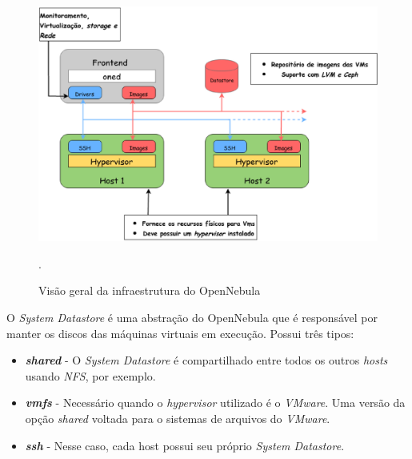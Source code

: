 \begin{figure}[!htb]
\centering
\includegraphics [keepaspectratio=true,scale=0.5]{figuras/opennebula_struct.eps}
\caption{Visão geral da infraestrutura do OpenNebula}
\cite{opennebula}.
\label{diagramaopennebula}
\end{figure}

O \textit{System Datastore} é uma abstração do OpenNebula que é responsável por manter os discos das máquinas virtuais em execução. Possui três tipos\cite{opennebula}:

\begin{itemize}
\item \textit{\textbf{shared}} - O \textit{System Datastore} é compartilhado entre todos os outros \textit{hosts} usando \textit{NFS}, por exemplo.
\item \textit{\textbf{vmfs}} - Necessário quando o \textit{hypervisor} utilizado é o \textit{VMware}. Uma versão da opção \textit{shared} voltada para o sistemas de arquivos do \textit{VMware}.
\item \textit{\textbf{ssh}} - Nesse caso, cada host possui seu próprio \textit{System Datastore}.
\end{itemize}


